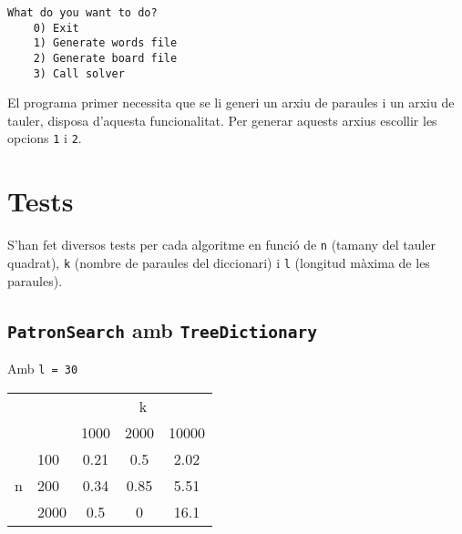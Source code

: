﻿\documentclass{article}
\begin{document}
\begin{lstlisting}[frame=single]
	What do you want to do?
	0) Exit
	1) Generate words file
	2) Generate board file
	3) Call solver
\end{lstlisting}

El programa primer necessita que se li generi un arxiu de paraules i un arxiu de tauler, disposa d'aquesta funcionalitat. Per generar aquests arxius escollir les opcions \verb|1| i \verb|2|.

\section{Tests}

S'han fet diversos tests per cada algoritme en funció de \verb|n| (tamany del tauler quadrat), \verb|k| (nombre de paraules del diccionari) i \verb|l| (longitud màxima de les paraules).

\subsection{\texttt{PatronSearch} amb \texttt{TreeDictionary}}

Amb \verb|l = 30|

\begin{tabular}{cl||c|c|c}
	\multicolumn{2}{c}{ } & \multicolumn{3}{c}{k} \\
	 & & 1000 & 2000 & 10000 \\
	\cline{2-5}
	\multirow{3}{*}{n} 
	& 100 & 0.21 & 0.5 & 2.02 \\
	& 200 & 0.34 & 0.85 & 5.51 \\
	& 2000 & 0.5 & 0 & 16.1 \\
\end{tabular}
\end{document}
